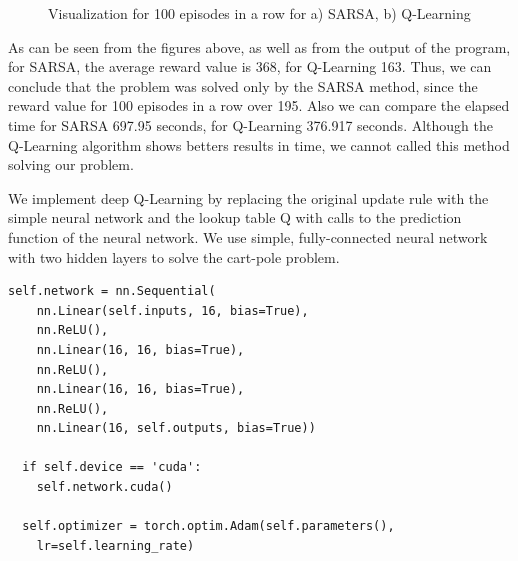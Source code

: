 \documentclass[a4paper, twoside, english]{article}
\begin{document}
\begin{figure}[h!]
	\centerline
	{
		\quad
	}
	\caption[null]{Visualization for 100 episodes in a row for a) SARSA, b) Q-Learning}
	\label{fig:deep_learn1}
\end{figure}
 As can be seen from the figures above, as well as from the output of the program, for SARSA, the average reward value is 368, for Q-Learning 163. Thus, we can conclude that the problem was solved only by the SARSA method, since the reward value for 100 episodes in a row over 195. Also we can compare the elapsed time for SARSA 697.95 seconds, for Q-Learning 376.917 seconds. Although the Q-Learning algorithm shows betters results in time, we cannot called this method solving our problem.
 
We implement deep Q-Learning by replacing the original update rule with the simple neural network and the lookup table Q with calls to the prediction function of the neural network. We use simple, fully-connected neural network with two hidden layers to solve the cart-pole problem. \\


\begin{lstlisting}[language=iPython]
  self.network = nn.Sequential(
  	nn.Linear(self.inputs, 16, bias=True),
  	nn.ReLU(),
  	nn.Linear(16, 16, bias=True),
  	nn.ReLU(),
  	nn.Linear(16, 16, bias=True),
  	nn.ReLU(),
  	nn.Linear(16, self.outputs, bias=True))
  	
  if self.device == 'cuda':
  	self.network.cuda()
  	
  self.optimizer = torch.optim.Adam(self.parameters(),
  	lr=self.learning_rate)
\end{lstlisting}
\end{document}
